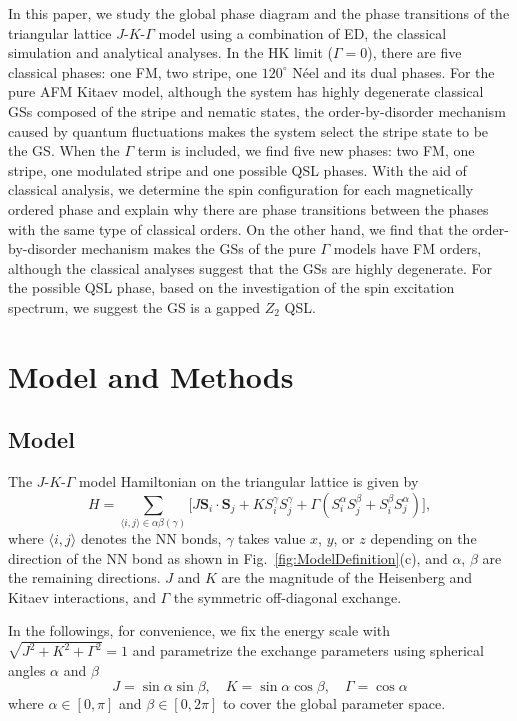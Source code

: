\documentclass[aps,prb,reprint,amsfonts,amsmath,amssymb,showpacs,groupedaddress,superscriptaddress]{revtex4-1}
\begin{document}
In this paper, we study the global phase diagram and the phase transitions of the triangular lattice $J$-$K$-$\Gamma$ model using a combination of ED, the classical simulation and analytical analyses. In the HK limit ($\Gamma=0$), there are five classical phases: one FM, two stripe, one $120^{\circ}$ N\'{e}el and its dual phases. For the pure AFM Kitaev model, although the system has highly degenerate classical GSs composed of the stripe and nematic states, the order-by-disorder mechanism caused by quantum fluctuations makes the system select the stripe state to be the GS. When the $\Gamma$ term is included, we find five new phases: two FM, one stripe, one modulated stripe and one possible QSL phases. With the aid of classical analysis, we determine the spin configuration for each magnetically ordered phase and explain why there are phase transitions between the phases with the same type of classical orders. On the other hand, we find that the order-by-disorder mechanism makes the GSs of the pure $\Gamma$ models have FM orders, although the classical analyses suggest that the GSs are highly degenerate. For the possible QSL phase, based on the investigation of the spin excitation spectrum, we suggest the GS is a gapped $Z_{2}$ QSL.

\section{Model and Methods}

\subsection{\label{sec:Model}Model}

The $J$-$K$-$\Gamma$ model Hamiltonian on the triangular lattice is given by
\begin{equation}
    H = \sum_{\langle i,j \rangle \in \alpha \beta (\gamma)} \lbrack J \bm{S}_i \cdot \bm{S}_j + K S_i^{\gamma} S_j^{\gamma} + \Gamma (S_i^{\alpha} S_j^{\beta} + S_i^{\beta} S_j^{\alpha}) \rbrack,
    \label{eq:Hamiltonian}
\end{equation}
where $\langle i,j \rangle$ denotes the NN bonds, $\gamma$ takes value $x$, $y$, or $z$ depending on the direction of the NN bond as shown in Fig.~\ref{fig:ModelDefinition}(c), and $\alpha$, $\beta$ are the remaining directions. $J$ and $K$ are the magnitude of the Heisenberg and Kitaev interactions, and $\Gamma$ the symmetric off-diagonal exchange.

In the followings, for convenience, we fix the energy scale with $\sqrt{J^2 + K^2 + \Gamma^2}=1$ and parametrize the exchange parameters using spherical angles $\alpha$ and $\beta$
\begin{equation}
    J = \sin\alpha \sin\beta, \quad
    K = \sin\alpha \cos\beta, \quad
    \Gamma = \cos\alpha
    \label{eq:Parameters}
\end{equation}
where $\alpha \in [0, \pi]$ and $\beta \in [0, 2\pi]$ to cover the global parameter space.
\end{document}
